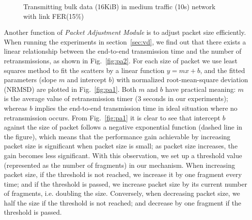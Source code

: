\documentclass[runningheads,a4paper]{llncs}
\begin{document}
\begin{figure}
	\vspace{-10pt}
	\centering
	\caption{Transmitting bulk data (16KiB) in medium traffic (10s) network with link FER(15\%)}
	\label{fig:pa}
	\vspace{-10pt}
\end{figure}
Another function of \emph{Packet Adjustment Module} is to adjust packet size efficiently. When running the experiments in section~\ref{sec:vd}, we find out that there exists a linear relationship between the end-to-end transmission time and the number of retransmissions, as shown in Fig.~\ref{fig:pa2}. For each size of packet we use least squares method to fit the scatters by a linear function $y=mx+b$, and the fitted parameters (slope $m$ and intercept $b$) with normalized root-mean-square deviation (NRMSD) are plotted in Fig.~\ref{fig:pa1}. Both $m$ and $b$ have practical meaning: $m$ is the average value of retransmission timer (3 seconds in our experiments); whereas $b$ implies the end-to-end transmission time in ideal situation where no retransmission occurs. From Fig.~\ref{fig:pa1} it is clear to see that intercept $b$ against the size of packet follows a negative exponential function (dashed line in the figure), which means that the performance gain achievable by increasing packet size is significant when packet size is small; as packet size increases, the gain becomes less significant. With this observation, we set up a threshold value (represented as the number of fragments) in our mechanism. When increasing packet size, if the threshold is not reached, we increase it by one fragment every time; and if the threshold is passed, we increase packet size by its current number of fragments, i.e. doubling the size. Conversely, when decreasing packet size, we half the size if the threshold is not reached; and decrease by one fragment if the threshold is passed.
\end{document}
